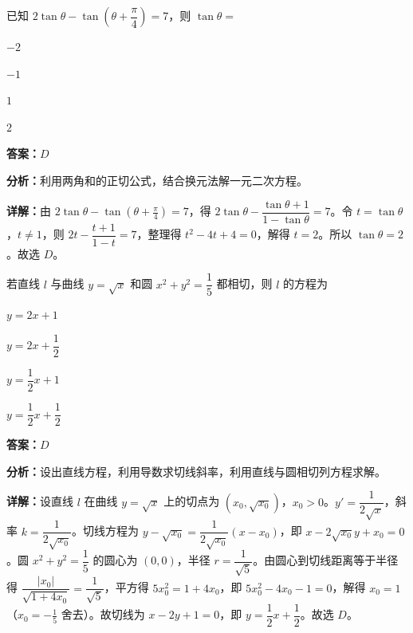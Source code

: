 \begin{question}[points=5]
已知 $2\tan\theta-\tan\left(\theta+\dfrac{\pi}{4}\right)=7$，则 $\tan\theta=$
\begin{choices}
  \item $-2$
  \item $-1$
  \item $1$
  \item $2$
\end{choices}
\begin{solution}
\textbf{答案：}$D$

\textbf{分析：}利用两角和的正切公式，结合换元法解一元二次方程。

\textbf{详解：}由 $2\tan\theta-\tan(\theta+\frac{\pi}{4})=7$，得 $2\tan\theta-\dfrac{\tan\theta+1}{1-\tan\theta}=7$。令 $t=\tan\theta$，$t\neq1$，则 $2t-\dfrac{t+1}{1-t}=7$，整理得 $t^2-4t+4=0$，解得 $t=2$。所以 $\tan\theta=2$。故选 $D$。
\end{solution}
\end{question}

\begin{question}[points=5]
若直线 $l$ 与曲线 $y=\sqrt{x}$ 和圆 $x^2+y^2=\dfrac{1}{5}$ 都相切，则 $l$ 的方程为
\begin{choices}
  \item $y=2x+1$
  \item $y=2x+\dfrac12$
  \item $y=\dfrac12x+1$
  \item $y=\dfrac12x+\dfrac12$
\end{choices}
\begin{solution}
\textbf{答案：}$D$

\textbf{分析：}设出直线方程，利用导数求切线斜率，利用直线与圆相切列方程求解。

\textbf{详解：}设直线 $l$ 在曲线 $y=\sqrt{x}$ 上的切点为 $(x_0,\sqrt{x_0})$，$x_0>0$。$y'=\dfrac{1}{2\sqrt{x}}$，斜率 $k=\dfrac{1}{2\sqrt{x_0}}$。切线方程为 $y-\sqrt{x_0}=\dfrac{1}{2\sqrt{x_0}}(x-x_0)$，即 $x-2\sqrt{x_0}y+x_0=0$。圆 $x^2+y^2=\dfrac15$ 的圆心为 $(0,0)$，半径 $r=\dfrac{1}{\sqrt{5}}$。由圆心到切线距离等于半径得 $\dfrac{|x_0|}{\sqrt{1+4x_0}}=\dfrac{1}{\sqrt{5}}$，平方得 $5x_0^2=1+4x_0$，即 $5x_0^2-4x_0-1=0$，解得 $x_0=1$（$x_0=-\frac15$ 舍去）。故切线为 $x-2y+1=0$，即 $y=\dfrac12x+\dfrac12$。故选 $D$。
\end{solution}
\end{question}

